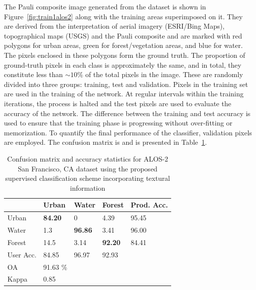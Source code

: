 The Pauli composite image generated from the dataset is shown in Figure~\ref{fig:train1alos2} along with the training areas superimposed on it. They are derived from the interpretation of aerial imagery (ESRI/Bing Maps), topographical maps (USGS) and the Pauli composite and are marked with red polygons for urban areas, green for forest/vegetation areas, and blue for water. The pixels enclosed in these polygons form the ground truth. The proportion of ground-truth pixels in each class is approximately the same, and in total, they constitute less than $\sim10\%$ of the total pixels in the image. These are randomly divided into three groups: training, test and validation. Pixels in the training set are used in the training of the network. At regular intervals within the training iterations, the process is halted and the test pixels are used to evaluate the accuracy of the network. The difference between the training and test accuracy is used to ensure that the training phase is progressing without over-fitting or memorization. To quantify the final performance of the classifier, validation pixels are employed. The confusion matrix is and is presented in Table~\ref{tab:alos2tab}.













\begin{table}[tbp]
	\caption{Confusion matrix and accuracy statistics for ALOS-2 San Francisco, CA dataset using the proposed supervised classification scheme incorporating textural information}
	\label{tab:alos2tab}
	\begin{tabularx}{\columnwidth}{X|XXX|X}
		& Urban & Water  & Forest & Prod. Acc. \\ \hline
		Urban & \bf{84.20} & 0 & 4.39 & 95.45  \\
		Water & 1.3 & \bf{96.86} & 3.41 & 96.00 \\
		Forest & 14.5 & 3.14 & \bf{92.20} & 84.41\\ \hline 
		User Acc. & 84.85 & 96.97 &   92.93 & \\ \hline
		OA &  91.63 \% & & &  \\
		Kappa & 0.85 & & &  \\
	\end{tabularx}
\end{table}


